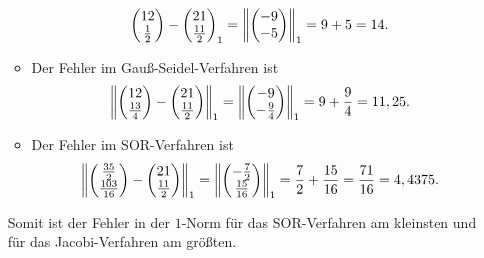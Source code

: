 \documentclass{exercise}
\begin{document}
\begin{enumerate}
\begin{itemize}
\[{\begin{pmatrix}
                    12\\
                    \frac{1}{2}
                \end{pmatrix} - \begin{pmatrix}
                    21\\
                    \frac{11}{2}
                \end{pmatrix}}_1 = \norm*{\begin{pmatrix}
                    -9\\
                    -5
                \end{pmatrix}}_1 = 9 + 5 = 14.
            \]
            \item Der Fehler im Gauß-Seidel-Verfahren ist
            \[
                \norm*{\begin{pmatrix}
                    12\\
                    \frac{13}{4}
                \end{pmatrix} - \begin{pmatrix}
                    21\\
                    \frac{11}{2}
                \end{pmatrix}}_1 = \norm*{\begin{pmatrix}
                    -9\\
                    -\frac{9}{4}
                \end{pmatrix}}_1 = 9 + \frac{9}{4} = 11,25.
            \]
            \item Der Fehler im SOR-Verfahren ist
            \[
                \norm*{\begin{pmatrix}
                    \frac{35}{2}\\
                    \frac{103}{16}
                \end{pmatrix} - \begin{pmatrix}
                    21\\
                    \frac{11}{2}
                \end{pmatrix}}_1 = \norm*{\begin{pmatrix}
                    -\frac{7}{2}\\
                    \frac{15}{16}
                \end{pmatrix}}_1 = \frac{7}{2} + \frac{15}{16} = \frac{71}{16} = 4,4375.
            \]
        \end{itemize}
        Somit ist der Fehler in der \(1\)-Norm für das SOR-Verfahren am kleinsten und für das Jacobi-Verfahren am größten.
    \end{enumerate}
\end{document}
